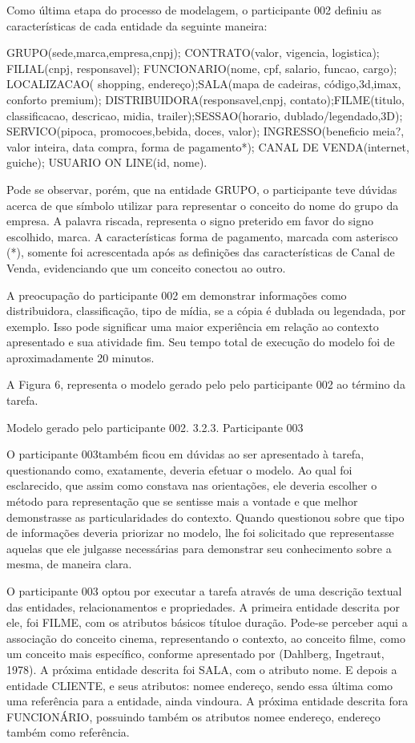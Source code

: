 Como última etapa do processo de modelagem, o participante 002 definiu as características de cada entidade da seguinte maneira:

GRUPO(sede,marca,empresa,cnpj); CONTRATO(valor, vigencia, logistica); FILIAL(cnpj, responsavel); FUNCIONARIO(nome, cpf, salario, funcao, cargo); LOCALIZACAO( shopping, endereço);SALA(mapa de cadeiras, código,3d,imax, conforto premium); DISTRIBUIDORA(responsavel,cnpj, contato);FILME(titulo, classificacao, descricao, midia, trailer);SESSAO(horario, dublado/legendado,3D); SERVICO(pipoca, promocoes,bebida, doces, valor); INGRESSO(beneficio meia?, valor inteira, data compra, forma de pagamento*); CANAL DE VENDA(internet, guiche); USUARIO ON LINE(id, nome).

Pode se observar, porém, que na entidade GRUPO, o participante teve dúvidas acerca de que símbolo utilizar para representar o conceito do nome do grupo da empresa. A palavra riscada, representa o signo preterido em favor do signo escolhido, marca. A características forma de pagamento, marcada com asterisco (*), somente foi acrescentada após as definições das características de Canal de Venda, evidenciando que um conceito conectou ao outro.

A preocupação do participante 002 em demonstrar informações como distribuidora, classificação, tipo de mídia, se a cópia é dublada ou legendada, por exemplo. Isso pode significar uma maior experiência em relação ao contexto apresentado e sua atividade fim. Seu tempo total de execução do modelo foi de aproximadamente 20 minutos.

A Figura 6, representa o modelo gerado pelo pelo participante 002 ao término da tarefa.


Modelo gerado pelo participante 002.
3.2.3. Participante 003

O participante 003também ficou em dúvidas ao ser apresentado à tarefa, questionando como, exatamente, deveria efetuar o modelo. Ao qual foi esclarecido, que assim como constava nas orientações, ele deveria escolher o método para representação que se sentisse mais a vontade e que melhor demonstrasse as particularidades do contexto. Quando questionou sobre que tipo de informações deveria priorizar no modelo, lhe foi solicitado que representasse aquelas que ele julgasse necessárias para demonstrar seu conhecimento sobre a mesma, de maneira clara.

O participante 003 optou por executar a tarefa através de uma descrição textual das entidades, relacionamentos e propriedades. A primeira entidade descrita por ele, foi FILME, com os atributos básicos títuloe duração. Pode-se perceber aqui a associação do conceito cinema, representando o contexto, ao conceito filme, como um conceito mais específico, conforme apresentado por (Dahlberg, Ingetraut, 1978). A próxima entidade descrita foi SALA, com o atributo nome. E depois a entidade CLIENTE, e seus atributos: nomee endereço, sendo essa última como uma referência para a entidade, ainda vindoura. A próxima entidade descrita fora FUNCIONÁRIO, possuindo também os atributos nomee endereço, endereço também como referência.

